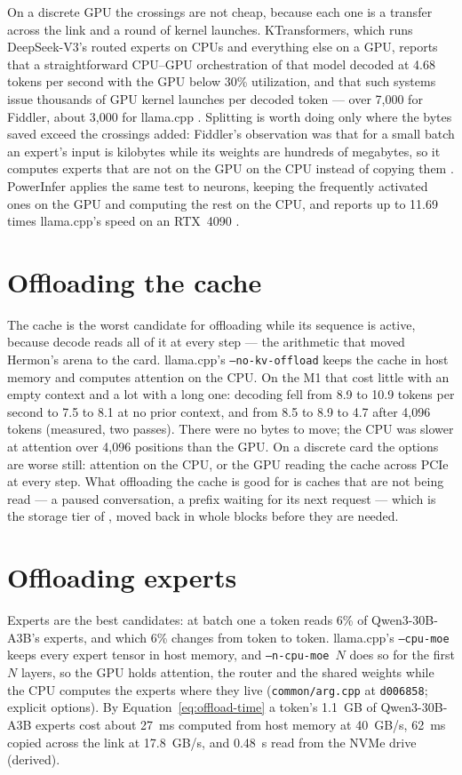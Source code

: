 On a discrete GPU the crossings are not cheap, because each one is a
transfer across the link and a round of kernel launches. KTransformers, which
runs DeepSeek-V3's routed experts on CPUs and everything else on a GPU, reports
that a straightforward CPU--GPU orchestration of that
model decoded at 4.68 tokens per second with the GPU below 30\% utilization, and
that such systems issue thousands of GPU kernel launches per decoded token ---
over 7,000 for Fiddler, about 3,000 for llama.cpp
\cite{chen2025ktransformers}. Splitting is worth doing only where the bytes
saved exceed the crossings added: Fiddler's observation was that for a small
batch an expert's input is kilobytes while its weights are hundreds of
megabytes, so it computes experts that are not on the GPU on the CPU instead of
copying them \cite{kamahori2025fiddler}. PowerInfer applies the same test to
neurons, keeping the frequently activated ones on the GPU and computing the
rest on the CPU, and reports up to 11.69 times llama.cpp's speed on an RTX~4090
\cite{song2024powerinfer}.

\section{Offloading the cache}

The cache is the worst candidate for offloading while its sequence is active,
because decode reads all of it at every step --- the arithmetic that moved
Hermon's arena to the card. llama.cpp's \texttt{--no-kv-offload} keeps the
cache in host memory and computes attention on the CPU. On the M1 that cost
little with an empty context and a lot with a long one: decoding fell from
8.9 to 10.9 tokens per second to 7.5 to 8.1 at no prior context, and from 8.5 to
8.9 to 4.7 after 4,096 tokens (measured, two passes). There were no bytes to
move; the CPU was slower at attention over 4,096 positions than the GPU. On a
discrete card the options are worse still: attention on the CPU, or the GPU
reading the cache across PCIe at every step. What offloading the cache is good
for is caches that are not being read --- a paused conversation, a prefix
waiting for its next request --- which is the storage tier of
, moved back in whole blocks before they are needed.

\section{Offloading experts}

Experts are the best candidates: at batch one a token reads 6\% of Qwen3-30B-A3B's
experts, and which 6\% changes from token to token. llama.cpp's
\texttt{--cpu-moe} keeps every expert tensor in host memory, and
\texttt{--n-cpu-moe}~$N$ does so for the first $N$ layers, so the GPU holds
attention, the router and the shared weights while the CPU computes the
experts where they live (\texttt{common/arg.cpp} at \texttt{d006858}; explicit
options). By Equation~\ref{eq:offload-time} a
token's 1.1~GB of Qwen3-30B-A3B experts cost about 27~ms computed from host
memory at 40~GB/s, 62~ms copied across the link at 17.8~GB/s, and 0.48~s read
from the NVMe drive (derived).

